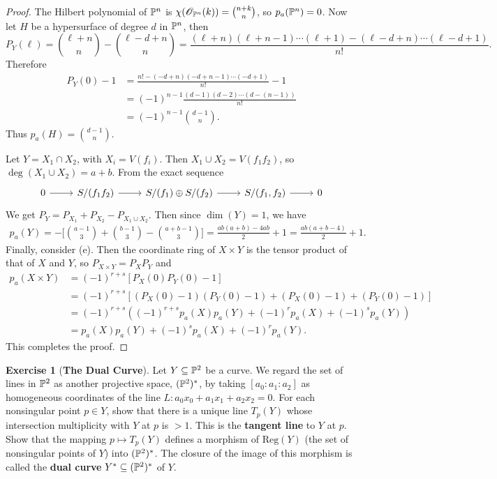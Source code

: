\documentclass[11pt]{book}
\theoremstyle{definition}
\newtheorem{exercise}{Exercise}[section]
\begin{document}
\begin{proof}
The Hilbert polynomial of $\P^n$ is $\chi(\mathscr{O}_{\P^n}(k))=\binom{n+k}{n}$, so $p_a(\P^n)=0$. Now let $H$ be a hypersurface of degree $d$ in $\P^n$, then
\[P_Y(\ell)=\binom{\ell+n}{n}-\binom{\ell-d+n}{n}=\frac{(\ell+n)(\ell+n-1)\cdots(\ell+1)-(\ell-d+n)\cdots(\ell-d+1)}{n!}.\]
Therefore
\begin{align*}
P_Y(0)-1&=\frac{n!-(-d+n)(-d+n-1)\cdots(-d+1)}{n!}-1\\
&=(-1)^{n-1}\frac{(d-1)(d-2)\cdots(d-(n-1))}{n!}\\
&=(-1)^{n-1}\binom{d-1}{n}.
\end{align*}
Thus $p_a(H)=\binom{d-1}{n}$.\par
Let $Y=X_1\cap X_2$, with $X_i=V(f_i)$. Then $X_1\cup X_2=V(f_1f_2)$, so $\deg(X_1\cup X_2)=a+b$. From the exact sequence
\[\begin{tikzcd}
0\ar[r]&S/(f_1f_2)\ar[r]&S/(f_1)\oplus S/(f_2)\ar[r]& S/(f_1,f_2)\ar[r]&0
\end{tikzcd}\]
We get $P_{Y}=P_{X_1}+P_{X_2}-P_{X_1\cup X_2}$. Then since $\dim(Y)=1$, we have
\begin{align*}
p_a(Y)=-\Big[\binom{a-1}{3}+\binom{b-1}{3}-\binom{a+b-1}{3}\Big]=\frac{ab(a+b)-4ab}{2}+1=\frac{ab(a+b-4)}{2}+1.
\end{align*}
Finally, consider (e). Then the coordinate ring of $X\times Y$ is the tensor product of that of $X$ and $Y$, so $P_{X\times Y}=P_XP_Y$ and
\begin{align*}
p_a(X\times Y)&=(-1)^{r+s}[P_X(0)P_Y(0)-1]\\
&=(-1)^{r+s}[(P_X(0)-1)(P_Y(0)-1)+(P_X(0)-1)+(P_Y(0)-1)]\\
&=(-1)^{r+s}((-1)^{r+s}p_a(X)p_a(Y)+(-1)^{r}p_a(X)+(-1)^sp_a(Y))\\
&=p_a(X)p_a(Y)+(-1)^sp_a(X)+(-1)^rp_a(Y).
\end{align*}
This completes the proof. 
\end{proof}
\begin{exercise}[\textbf{The Dual Curve}]
Let $Y\sub\P^2$ be a curve. We regard the set of lines in $\P^2$ as another projective space, $(\P^2)^*$, by taking $[a_0:a_1:a_2]$ as homogeneous coordinates of the line $L:a_0x_0+a_1x_1+a_2x_2=0$. For each nonsingular point $p\in Y$, show that there is a unique line $T_p(Y)$ whose intersection multiplicity with $Y$ at $p$ is $>1$. This is the \textbf{tangent line} to $Y$ at $p$. Show that the mapping $p\mapsto T_p(Y)$ defines a morphism of $\mathrm{Reg}(Y)$ (the set of nonsingular points of $Y$) into $(\P^2)^*$. The closure of the image of this morphism is called the \textbf{dual curve} $Y^*\sub(\P^2)^*$ of $Y$.
\end{exercise}
\end{document}
